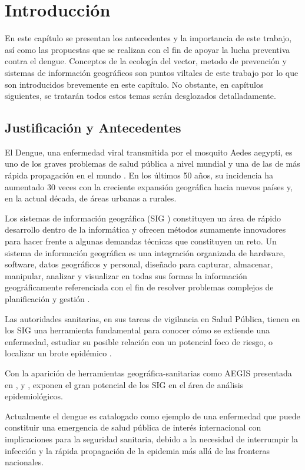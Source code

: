 \chapter{Introducción}
En este capítulo se presentan los antecedentes y la importancia de este trabajo, así como las
propuestas que se realizan con el fin de apoyar la lucha preventiva contra el dengue. Conceptos de
la ecología del vector, metodo de prevención y sistemas de información geográficos son puntos
viltales de este trabajo por lo que son introducidos brevemente en este capítulo. No obstante, en
capítulos siguientes, se tratarán todos estos temas serán desglozados detalladamente.

\section{Justificación y Antecedentes}

El Dengue, una enfermedad viral transmitida por el mosquito Aedes aegypti, es uno de los graves
problemas de salud pública a nivel mundial y una de las de más rápida propagación en el mundo
. En los últimos 50 años, su incidencia ha aumentado 30 veces con la creciente expansión
geográfica hacia nuevos países y, en la actual década, de áreas urbanas a rurales.

Los sistemas de información geográfica (SIG ) constituyen un área de rápido desarrollo dentro
de la informática y ofrecen métodos sumamente innovadores para hacer frente a algunas demandas
técnicas que constituyen un reto. Un sistema de información geográfica es una integración
organizada de hardware, software, datos geográficos y personal, diseñado para capturar, almacenar,
manipular, analizar y visualizar en todas sus formas la información geográficamente referenciada
con el fin de resolver problemas complejos de planificación y gestión \cite{lopezMarcos2007}.

Las autoridades sanitarias, en sus tareas de vigilancia en Salud Pública, tienen en los SIG una
herramienta fundamental para conocer cómo se extiende una enfermedad, estudiar su posible relación
con un potencial foco de riesgo, o localizar un brote epidémico \cite{vgomesAegis2001}.

Con la aparición de herramientas geográfica-sanitarias como AEGIS presentada en
\cite{vgomesAegis2001}, y \cite{NINO2011}, exponen el gran potencial de los SIG en el área de
análisis epidemiológicos.

Actualmente el dengue es catalogado como ejemplo de una enfermedad que puede constituir una
emergencia de salud pública de interés internacional con implicaciones para la seguridad
sanitaria, debido a la necesidad de interrumpir la infección y la rápida propagación de la
epidemia más allá de las fronteras nacionales.

